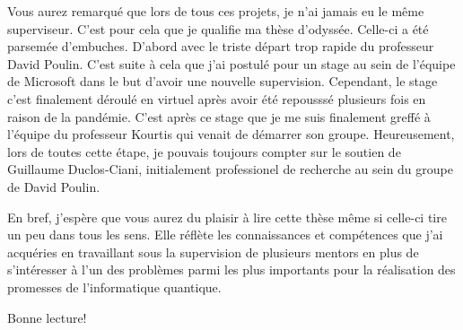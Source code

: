 Vous aurez remarqué que lors de tous ces projets,
je n'ai jamais eu le même superviseur.
C'est pour cela que je qualifie ma thèse d'odyssée.
Celle-ci a été parsemée d'embuches.
D'abord avec le triste départ trop rapide du professeur David Poulin.
C'est suite à cela que j'ai postulé pour un stage au sein de l'équipe de Microsoft
dans le but d'avoir une nouvelle supervision.
Cependant, le stage c'est finalement déroulé en virtuel après avoir été repousssé
plusieurs fois en raison de la pandémie.
C'est après ce stage que je me suis finalement greffé à l'équipe du professeur Kourtis 
qui venait de démarrer son groupe.
Heureusement,
lors de toutes cette étape, 
je pouvais toujours compter sur le soutien de Guillaume Duclos-Ciani,
initialement professionel de recherche au sein du groupe de David Poulin.

En bref,
j'espère que vous aurez du plaisir à lire cette thèse même si celle-ci 
tire un peu dans tous les sens.
Elle réflète les connaissances et compétences que j'ai acquéries en travaillant sous 
la supervision de plusieurs mentors en plus de s'intéresser à l'un des problèmes
parmi les plus importants pour la réalisation des promesses de l'informatique quantique.

Bonne lecture!
